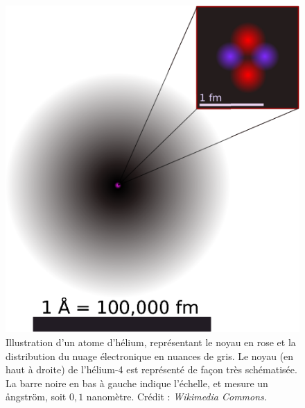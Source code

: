 	\begin{figure}[htb]
		\centering
		\includegraphics[width=\textwidth]{figures/ch1/helium}
		\caption{Illustration d'un atome d'hélium, représentant le noyau en rose et la distribution du nuage électronique en nuances de gris. Le noyau (en haut à droite) de l'hélium-4 est représenté de façon très schématisée. La barre noire en bas à gauche indique l'échelle, et mesure un \aa{}ngström, soit $0,1$ nanomètre. Crédit : \emph{Wikimedia Commons.}}
		\label{fig:helium}
	\end{figure}
	
